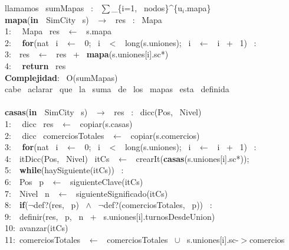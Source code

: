 \begin{Algoritmos}
    llamamos \ sumMapas \ : \ $\sum$\_\{i=1, \ nodos\}\^{}\{u$_i$.mapa\}\\
    \noindent\makebox[\linewidth]{\rule{\textwidth}{0.4pt}}
    \textbf{mapa}(\textbf{in \ }SimCity \ s) \ $\rightarrow $ \ res \ : \ Mapa \ \\
    1: \  \ Mapa \ res \ $\leftarrow$ \ s.mapa\\
    2: \  \ \textbf{for}(nat \ i \ $\leftarrow$ \ 0; \ i \ $<$ \ long(s.uniones); \ i \ $\leftarrow$ \ i \ + \ 1) \ : \ \\
    3:\indent  \  \ res \ $\leftarrow$ \ res \ + \ \textbf{mapa}(s.uniones[i].sc*)\\
    4: \  \ \textbf{return} \ res\\
    \textbf{Complejidad}: \ O(sumMapas) \ \\
    cabe \ aclarar \ que \ la \ suma \ de \ los \ mapas \ esta \ definida\\
    \noindent\makebox[\linewidth]{\rule{\textwidth}{0.4pt}}
    \\
    \noindent\makebox[\linewidth]{\rule{\textwidth}{0.4pt}}
    \textbf{casas}(\textbf{in \ }SimCity \ s) \ $\rightarrow $ \ res \ : \ dicc(Pos, \ Nivel)\\
    1: \  \ dicc \ res \ $\leftarrow$ \ copiar(s.casas)\\
    2: \  \ dicc \ comerciosTotales \ $\leftarrow$ \ copiar(s.comercios)\\
    3: \  \ \textbf{for}(nat \ i \ $\leftarrow$ \ 0; \ i \ $<$ \ long(s.uniones); \ i \ $\leftarrow$ \ i \ + \ 1) \ : \ \\
    4:\indent  \  \ itDicc(Pos, \ Nivel) \ itCs \ $\leftarrow$ \ crearIt(\textbf{casas}(s.uniones[i].sc*));\\
    5:\indent  \  \ \textbf{while}(haySiguiente(itCs)) \ :\\
    6:\indent \indent  \  \ Pos \ p \ $\leftarrow$ \ siguienteClave(itCs)\\
    7:\indent \indent  \  \ Nivel \ n \ $\leftarrow$ \ siguienteSignificado(itCs)\\
    8:\indent \indent  \  \ \textbf{if}($\neg$def?(res, \ p) \ $\wedge$ \ $\neg$def?(comerciosTotales, \ p)) \ :\\
    9:\indent \indent \indent  \  \ definir(res, \ p, \ n \ + \ s.uniones[i].turnosDesdeUnion)\\
    10:\indent \indent  \ avanzar(itCs)\\
    11:\indent  \ comerciosTotales \ $\leftarrow$ \ comerciosTotales \ $\cup$ \ s.uniones[i].sc-$>$comercios\\

\end{Algoritmos}
